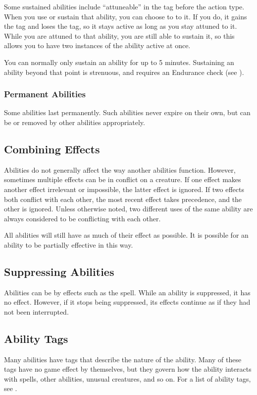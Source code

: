       Some sustained abilities include ``attuneable'' in the tag before the action type.
      When you use or sustain that ability, you can choose to  to it.
      If you do, it gains the  tag and loses the  tag, so it stays active as long as you stay attuned to it.
      While you are attuned to that ability, you are still able to sustain it, so this allows you to have two instances of the ability active at once.

      You can normally only sustain an ability for up to 5 minutes.
      Sustaining an ability beyond that point is strenuous, and requires an Endurance check (see ).

    \subsubsection{Permanent Abilities}
      Some abilities last permanently.
      Such abilities never expire on their own, but can be  or removed by other abilities appropriately.

  \subsection{Combining Effects}
    Abilities do not generally affect the way another abilities function.
    However, sometimes multiple effects can be in conflict on a creature.
    If one effect makes another effect irrelevant or impossible, the latter effect is ignored.
    If two effects both conflict with each other, the most recent effect takes precedence, and the other is ignored.
    Unless otherwise noted, two different uses of the same ability are always considered to be conflicting with each other.

    All abilities will still have as much of their effect as possible.
    It is possible for an ability to be partially effective in this way.

  \subsection{Suppressing Abilities}\label{Suppressing Abilities}
    Abilities can be  by effects such as the  spell.
    While an ability is suppressed, it has no effect.
    However, if it stops being suppressed, its effects continue as if they had not been interrupted.

  \subsection{Ability Tags}
    Many abilities have tags that describe the nature of the ability.
    Many of these tags have no game effect by themselves, but they govern how the ability interacts with spells, other abilities, unusual creatures, and so on.
    For a list of ability tags, see .
